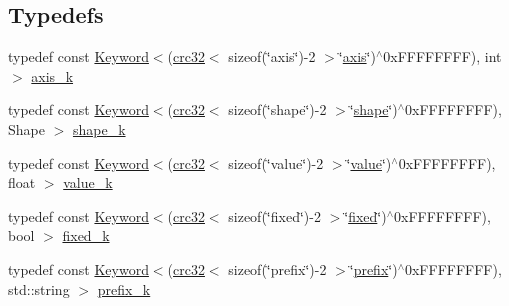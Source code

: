\subsection*{Typedefs}
\begin{DoxyCompactItemize}
\item 
typedef const \hyperlink{classmarian_1_1keywords_1_1Keyword}{Keyword}$<$(\hyperlink{compile__time__crc32_8h_afb8250edaa6a10de4050142c2361fbce}{crc32}$<$ sizeof(\char`\"{}axis\char`\"{})-\/2 $>$\char`\"{}\hyperlink{namespacemarian_1_1keywords_ace9158eabbddaca833133f12da98b9d6}{axis}\char`\"{})$^\wedge$0x\+F\+F\+F\+F\+F\+F\+F\+F), int $>$ \hyperlink{namespacemarian_1_1keywords_a10b8b729f40b2bc6f4b9d1f4486d03a4}{axis\+\_\+k}
\item 
typedef const \hyperlink{classmarian_1_1keywords_1_1Keyword}{Keyword}$<$(\hyperlink{compile__time__crc32_8h_afb8250edaa6a10de4050142c2361fbce}{crc32}$<$ sizeof(\char`\"{}shape\char`\"{})-\/2 $>$\char`\"{}\hyperlink{namespacemarian_1_1keywords_a5933d683efd12b59e17a7131fa64cf1c}{shape}\char`\"{})$^\wedge$0x\+F\+F\+F\+F\+F\+F\+F\+F), Shape $>$ \hyperlink{namespacemarian_1_1keywords_ac7bfe8a14a8b8ae619bab1dbc8ccdb54}{shape\+\_\+k}
\item 
typedef const \hyperlink{classmarian_1_1keywords_1_1Keyword}{Keyword}$<$(\hyperlink{compile__time__crc32_8h_afb8250edaa6a10de4050142c2361fbce}{crc32}$<$ sizeof(\char`\"{}value\char`\"{})-\/2 $>$\char`\"{}\hyperlink{namespacemarian_1_1keywords_ac70de1b4c3cf6b7080cf5086f2963fd8}{value}\char`\"{})$^\wedge$0x\+F\+F\+F\+F\+F\+F\+F\+F), float $>$ \hyperlink{namespacemarian_1_1keywords_a1ad46beee725aee3d84c27fd6e75886d}{value\+\_\+k}
\item 
typedef const \hyperlink{classmarian_1_1keywords_1_1Keyword}{Keyword}$<$(\hyperlink{compile__time__crc32_8h_afb8250edaa6a10de4050142c2361fbce}{crc32}$<$ sizeof(\char`\"{}fixed\char`\"{})-\/2 $>$\char`\"{}\hyperlink{namespacemarian_1_1keywords_aded1556eedfde0aef209b0e7d5443acd}{fixed}\char`\"{})$^\wedge$0x\+F\+F\+F\+F\+F\+F\+F\+F), bool $>$ \hyperlink{namespacemarian_1_1keywords_ad5baa099c8c1e66e037234d2cfd33fdb}{fixed\+\_\+k}
\item 
typedef const \hyperlink{classmarian_1_1keywords_1_1Keyword}{Keyword}$<$(\hyperlink{compile__time__crc32_8h_afb8250edaa6a10de4050142c2361fbce}{crc32}$<$ sizeof(\char`\"{}prefix\char`\"{})-\/2 $>$\char`\"{}\hyperlink{namespacemarian_1_1keywords_aa2cadd13ac94307ff92c68efb57264ac}{prefix}\char`\"{})$^\wedge$0x\+F\+F\+F\+F\+F\+F\+F\+F), std\+::string $>$ \hyperlink{namespacemarian_1_1keywords_a03f95871357599bf366571e00e22bd06}{prefix\+\_\+k}

\end{DoxyCompactItemize}
